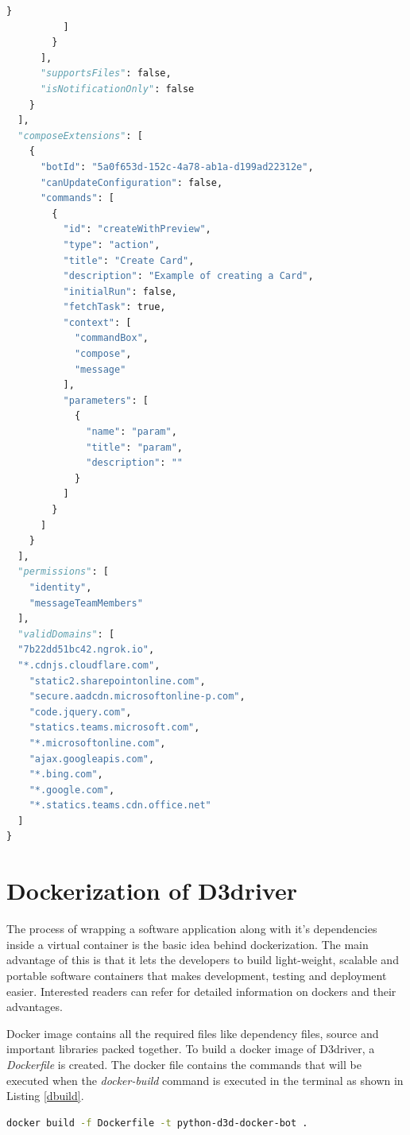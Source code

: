 \begin{lstlisting}[caption={Manifest file},label={lst:manifest},language=python]
            }
          ]
        }
      ],
      "supportsFiles": false,
      "isNotificationOnly": false
    }
  ],
  "composeExtensions": [
    {
      "botId": "5a0f653d-152c-4a78-ab1a-d199ad22312e",
      "canUpdateConfiguration": false,
      "commands": [
        {
          "id": "createWithPreview",
          "type": "action",
          "title": "Create Card",
          "description": "Example of creating a Card",
          "initialRun": false,
          "fetchTask": true,
          "context": [
            "commandBox",
            "compose",
            "message"
          ],
          "parameters": [
            {
              "name": "param",
              "title": "param",
              "description": ""
            }
          ]
        }
      ]
    }
  ],
  "permissions": [
    "identity",
    "messageTeamMembers"
  ],
  "validDomains": [
  "7b22dd51bc42.ngrok.io",
  "*.cdnjs.cloudflare.com",
	"static2.sharepointonline.com", 
	"secure.aadcdn.microsoftonline-p.com", 
	"code.jquery.com", 
	"statics.teams.microsoft.com", 
	"*.microsoftonline.com", 
	"ajax.googleapis.com",
	"*.bing.com", 
	"*.google.com",
  	"*.statics.teams.cdn.office.net"
  ]
}
\end{lstlisting}

\section{Dockerization of D3driver}

The process of wrapping a software application along with it's dependencies inside a virtual container is the basic idea behind dockerization. The main advantage of this is that it lets the developers to build light-weight, scalable and portable software containers that makes development, testing and deployment easier. Interested readers can refer \cite{rad2017introduction} for detailed information on dockers and their advantages.

Docker image contains all the required files like dependency files, source and important libraries packed together. To build a docker image of D3driver, a \textit{Dockerfile} is created. The docker file contains the commands that will be executed when the \textit{docker-build} command is executed in the terminal as shown in Listing \ref{dbuild}.  

\begin{lstlisting}[caption={Docker build command},label={dbuild},language=bash]
docker build -f Dockerfile -t python-d3d-docker-bot .
\end{lstlisting}

